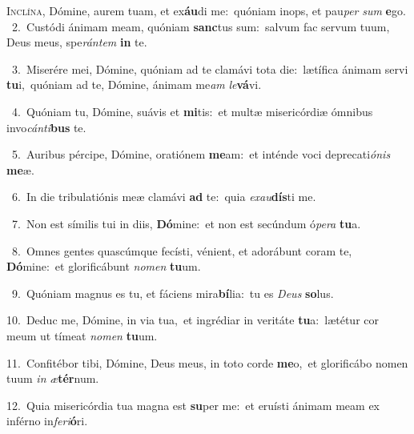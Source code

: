 \lettrine{\initial\textcolor{\initialcolor}{I}}{nclína,} Dómine, aurem tuam, et ex\-\textbf{áu}\-di me:~\star quóniam inops, et pau\textit{per} \textit{sum} \textbf{e}\-go.\\
{\numbfont\textcolor{\numbcolor}{~2.}}~Custódi ánimam meam, quóniam \textbf{sanc}\-tus sum:~\star salvum fac servum tuum, Deus meus, spe\-\textit{rán}\-\textit{tem} \textbf{in} te.\par
{\numbfont\textcolor{\numbcolor}{~3.}}~Miserére mei, Dómine, quóniam ad te clamávi tota die:~\dagger lætífica ánimam servi \textbf{tu}\-i,~\star quóniam ad te, Dómine, ánimam me\textit{am} \textit{le}\-\textbf{vá}vi.\par
{\numbfont\textcolor{\numbcolor}{~4.}}~Quóniam tu, Dómine, suávis et \textbf{mi}\-tis:~\star et multæ misericórdiæ ómnibus invo\-\textit{cán}\-\textit{ti}\textbf{bus} te.\par
{\numbfont\textcolor{\numbcolor}{~5.}}~Auribus pércipe, Dómine, oratiónem \textbf{me}\-am:~\star et inténde voci deprecati\-\textit{ó}\-\textit{nis} \textbf{me}\-æ.\par
{\numbfont\textcolor{\numbcolor}{~6.}}~In die tribulatiónis meæ clamávi \textbf{ad} te:~\star quia \textit{ex}\-\textit{au}\textbf{dís}ti me.\par
{\numbfont\textcolor{\numbcolor}{~7.}}~Non est símilis tui in diis, \textbf{Dó}\-mine:~\star et non est secúndum ó\-\textit{pe}\-\textit{ra} \textbf{tu}\-a.\par
{\numbfont\textcolor{\numbcolor}{~8.}}~Omnes gentes quascúmque fecísti, vénient, et adorábunt coram te, \textbf{Dó}\-mine:~\star et glorificábunt \textit{no}\-\textit{men} \textbf{tu}\-um.\par
{\numbfont\textcolor{\numbcolor}{~9.}}~Quóniam magnus es tu, et fáciens mira\-\textbf{bí}\-lia:~\star tu es \textit{De}\-\textit{us} \textbf{so}\-lus.\par
{\numbfont\textcolor{\numbcolor}{10.}}~Deduc me, Dómine, in via tua,~\dagger et ingrédiar in veritáte \textbf{tu}\-a:~\star lætétur cor meum ut tímeat \textit{no}\-\textit{men} \textbf{tu}\-um.\par
{\numbfont\textcolor{\numbcolor}{11.}}~Confitébor tibi, Dómine, Deus meus, in toto corde \textbf{me}\-o,~\star et glorificábo nomen tuum \textit{in} \textit{æ}\-\textbf{tér}num.\par
{\numbfont\textcolor{\numbcolor}{12.}}~Quia misericórdia tua magna est \textbf{su}\-per me:~\star et eruísti ánimam meam ex inférno in\-\textit{fe}\-\textit{ri}\textbf{ó}ri.\par
